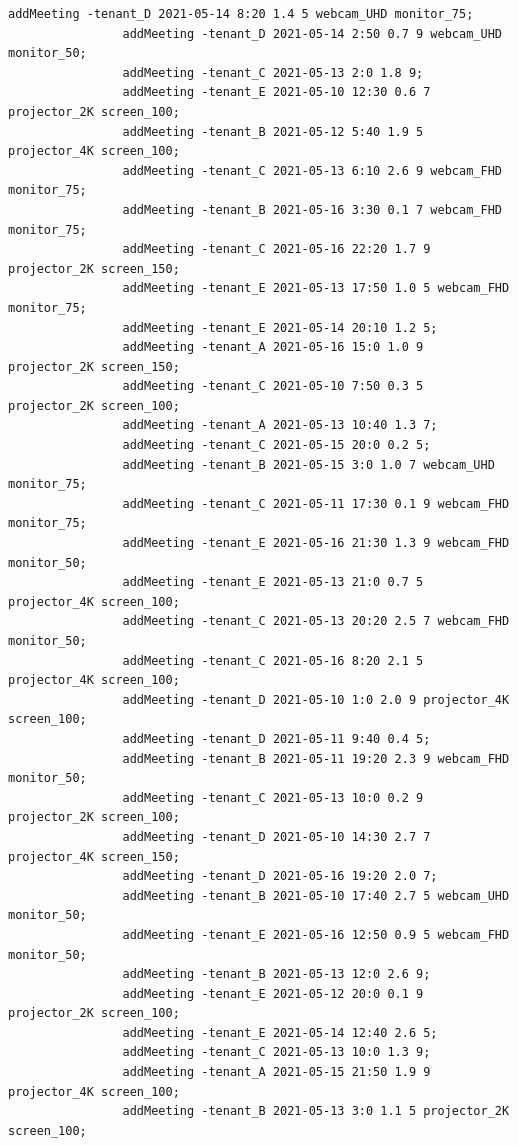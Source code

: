 \documentclass{article}
\begin{document}
\begin{Verbatim}[gobble=8]
                addMeeting -tenant_D 2021-05-14 8:20 1.4 5 webcam_UHD monitor_75;
                addMeeting -tenant_D 2021-05-14 2:50 0.7 9 webcam_UHD monitor_50;
                addMeeting -tenant_C 2021-05-13 2:0 1.8 9;
                addMeeting -tenant_E 2021-05-10 12:30 0.6 7 projector_2K screen_100;
                addMeeting -tenant_B 2021-05-12 5:40 1.9 5 projector_4K screen_100;
                addMeeting -tenant_C 2021-05-13 6:10 2.6 9 webcam_FHD monitor_75;
                addMeeting -tenant_B 2021-05-16 3:30 0.1 7 webcam_FHD monitor_75;
                addMeeting -tenant_C 2021-05-16 22:20 1.7 9 projector_2K screen_150;
                addMeeting -tenant_E 2021-05-13 17:50 1.0 5 webcam_FHD monitor_75;
                addMeeting -tenant_E 2021-05-14 20:10 1.2 5;
                addMeeting -tenant_A 2021-05-16 15:0 1.0 9 projector_2K screen_150;
                addMeeting -tenant_C 2021-05-10 7:50 0.3 5 projector_2K screen_100;
                addMeeting -tenant_A 2021-05-13 10:40 1.3 7;
                addMeeting -tenant_C 2021-05-15 20:0 0.2 5;
                addMeeting -tenant_B 2021-05-15 3:0 1.0 7 webcam_UHD monitor_75;
                addMeeting -tenant_C 2021-05-11 17:30 0.1 9 webcam_FHD monitor_75;
                addMeeting -tenant_E 2021-05-16 21:30 1.3 9 webcam_FHD monitor_50;
                addMeeting -tenant_E 2021-05-13 21:0 0.7 5 projector_4K screen_100;
                addMeeting -tenant_C 2021-05-13 20:20 2.5 7 webcam_FHD monitor_50;
                addMeeting -tenant_C 2021-05-16 8:20 2.1 5 projector_4K screen_100;
                addMeeting -tenant_D 2021-05-10 1:0 2.0 9 projector_4K screen_100;
                addMeeting -tenant_D 2021-05-11 9:40 0.4 5;
                addMeeting -tenant_B 2021-05-11 19:20 2.3 9 webcam_FHD monitor_50;
                addMeeting -tenant_C 2021-05-13 10:0 0.2 9 projector_2K screen_100;
                addMeeting -tenant_D 2021-05-10 14:30 2.7 7 projector_4K screen_150;
                addMeeting -tenant_D 2021-05-16 19:20 2.0 7;
                addMeeting -tenant_B 2021-05-10 17:40 2.7 5 webcam_UHD monitor_50;
                addMeeting -tenant_E 2021-05-16 12:50 0.9 5 webcam_FHD monitor_50;
                addMeeting -tenant_B 2021-05-13 12:0 2.6 9;
                addMeeting -tenant_E 2021-05-12 20:0 0.1 9 projector_2K screen_100;
                addMeeting -tenant_E 2021-05-14 12:40 2.6 5;
                addMeeting -tenant_C 2021-05-13 10:0 1.3 9;
                addMeeting -tenant_A 2021-05-15 21:50 1.9 9 projector_4K screen_100;
                addMeeting -tenant_B 2021-05-13 3:0 1.1 5 projector_2K screen_100;

\end{Verbatim}
\end{document}
